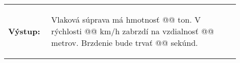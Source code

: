 \vspace{-2em}
\begin{tabular}{@{}p{0.15\linewidth}p{0.75\linewidth}}
\textbf{\small Výstup:} &
\vspace{-3em}
\begin{code}
Vlaková súprava má hmotnosť @\fbox{\phantom{vstup}}@ ton.
V rýchlosti @\fbox{\phantom{vstup}}@ km/h zabrzdí na vzdialnosť @\fbox{\phantom{vstup}}@ metrov.
Brzdenie bude trvať @\fbox{\phantom{vstup}}@ sekúnd.
\end{code}
\end{tabular}
\vspace{-2em}
 
